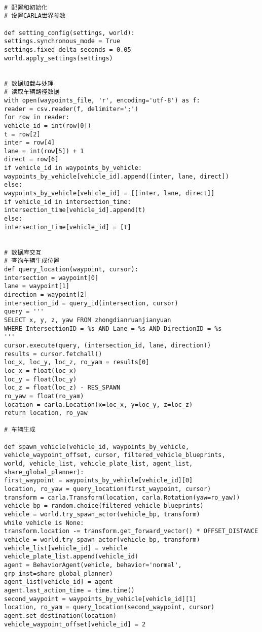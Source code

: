 \begin{lstlisting}
	
# 配置和初始化
# 设置CARLA世界参数

def setting_config(settings, world):
settings.synchronous_mode = True
settings.fixed_delta_seconds = 0.05
world.apply_settings(settings)
	
	
# 数据加载与处理
# 读取车辆路径数据
with open(waypoints_file, 'r', encoding='utf-8') as f:
reader = csv.reader(f, delimiter=';')
for row in reader:
vehicle_id = int(row[0])
t = row[2]
inter = row[4]
lane = int(row[5]) + 1
direct = row[6]
if vehicle_id in waypoints_by_vehicle:
waypoints_by_vehicle[vehicle_id].append([inter, lane, direct])
else:
waypoints_by_vehicle[vehicle_id] = [[inter, lane, direct]]
if vehicle_id in intersection_time:
intersection_time[vehicle_id].append(t)
else:
intersection_time[vehicle_id] = [t]
	
	
# 数据库交互
# 查询车辆生成位置
def query_location(waypoint, cursor):
intersection = waypoint[0]
lane = waypoint[1]
direction = waypoint[2]
intersection_id = query_id(intersection, cursor)
query = '''
SELECT x, y, z, yaw FROM zhongdianruanjianyuan
WHERE IntersectionID = %s AND Lane = %s AND DirectionID = %s
'''
cursor.execute(query, (intersection_id, lane, direction))
results = cursor.fetchall()
loc_x, loc_y, loc_z, ro_yam = results[0]
loc_x = float(loc_x)
loc_y = float(loc_y)
loc_z = float(loc_z) - RES_SPAWN
ro_yaw = float(ro_yam)
location = carla.Location(x=loc_x, y=loc_y, z=loc_z)
return location, ro_yaw
	
# 车辆生成

def spawn_vehicle(vehicle_id, waypoints_by_vehicle, vehicle_waypoint_offset, cursor, filtered_vehicle_blueprints,
world, vehicle_list, vehicle_plate_list, agent_list, share_global_planner):
first_waypoint = waypoints_by_vehicle[vehicle_id][0]
location, ro_yaw = query_location(first_waypoint, cursor)
transform = carla.Transform(location, carla.Rotation(yaw=ro_yaw))
vehicle_bp = random.choice(filtered_vehicle_blueprints)
vehicle = world.try_spawn_actor(vehicle_bp, transform)
while vehicle is None:
transform.location -= transform.get_forward_vector() * OFFSET_DISTANCE
vehicle = world.try_spawn_actor(vehicle_bp, transform)
vehicle_list[vehicle_id] = vehicle
vehicle_plate_list.append(vehicle_id)
agent = BehaviorAgent(vehicle, behavior='normal', grp_inst=share_global_planner)
agent_list[vehicle_id] = agent
agent.last_action_time = time.time()
second_waypoint = waypoints_by_vehicle[vehicle_id][1]
location, ro_yam = query_location(second_waypoint, cursor)
agent.set_destination(location)
vehicle_waypoint_offset[vehicle_id] = 2



\end{lstlisting}
